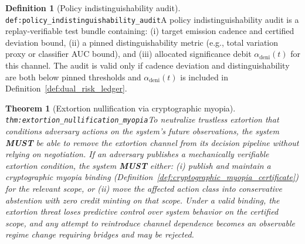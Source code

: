 \documentclass[11pt]{article}
\theoremstyle{definition}
\newtheorem{definition}{Definition}
\theoremstyle{plain}
\newtheorem{theorem}{Theorem}
\newcommand{\MUST}{\textbf{MUST}}
\newcommand{\lbl}[1]{\texttt{\footnotesize\nolinkurl{#1}}}
\newcommand{\DefLabel}[1]{\hfill{\small\lbl{#1}}}
\begin{document}
\begin{definition}[Policy indistinguishability audit]\DefLabel{def:policy_indistinguishability_audit}\label{def:policy_indistinguishability_audit}
A policy indistinguishability audit is a replay-verifiable test bundle containing:
(i) target emission cadence and certified deviation bound,
(ii) a pinned distinguishability metric (e.g., total variation proxy or classifier AUC bound),
and (iii) allocated significance debit $\alpha_{\mathrm{deni}}(t)$ for this channel.
The audit is valid only if cadence deviation and distinguishability are both below pinned thresholds and $\alpha_{\mathrm{deni}}(t)$ is included in Definition~\ref{def:dual_risk_ledger}.
\end{definition}

\begin{theorem}[Extortion nullification via cryptographic myopia]\DefLabel{thm:extortion_nullification_myopia}\label{thm:extortion_nullification_myopia}
To neutralize trustless extortion that conditions adversary actions on the system's future observations, the system \MUST{} be able to remove the extortion channel from its decision pipeline without relying on negotiation.
If an adversary publishes a mechanically verifiable extortion condition, the system \MUST{} either:
(i) publish and maintain a cryptographic myopia binding (Definition~\ref{def:cryptographic_myopia_certificate}) for the relevant scope, or
(ii) move the affected action class into conservative abstention with zero credit minting on that scope.
Under a valid binding, the extortion threat loses predictive control over system behavior on the certified scope, and any attempt to reintroduce channel dependence becomes an observable regime change requiring bridges and may be rejected.
\end{theorem}
\end{document}
